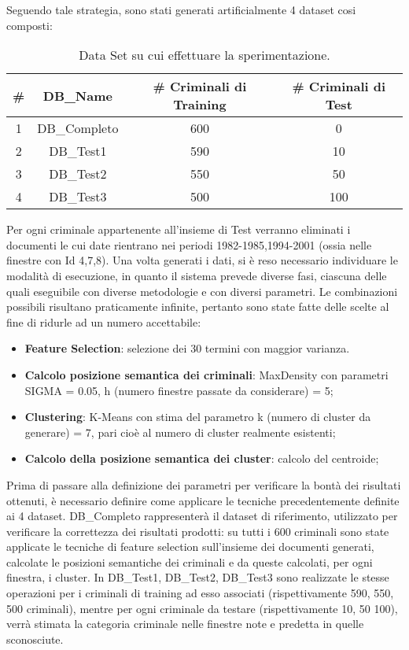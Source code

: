 Seguendo tale strategia, sono stati generati artificialmente 4 dataset cosi composti:
\begin{table}[H]
	\centering
	\footnotesize
	\begin{tabular}{|cccc|}
	\hline
	\textbf{\#} & \textbf{DB\_Name} & \textbf{\# Criminali di Training} & \textbf{\# Criminali di Test} \\ 
	\hline
	1 & DB\_Completo & 600 & 0 \\
	2 & DB\_Test1 & 590 & 10 \\
	3 & DB\_Test2 & 550 & 50 \\
	4 & DB\_Test3 & 500 & 100 \\
	\hline
	\end{tabular}
	\caption{Data Set su cui effettuare la sperimentazione.}
	\label{TAB_DB}
\end{table}
Per ogni criminale appartenente all'insieme di Test verranno eliminati i documenti le cui date rientrano nei periodi 1982-1985,1994-2001 (ossia nelle finestre con Id 4,7,8).
Una volta generati i dati, si è reso necessario individuare le modalità di esecuzione, in quanto il sistema prevede diverse fasi, ciascuna delle quali
eseguibile con diverse metodologie e con diversi parametri. Le combinazioni possibili risultano praticamente infinite, pertanto sono state fatte delle scelte al fine di ridurle ad un numero accettabile: 
\begin{itemize}
\item \textbf{Feature Selection}: selezione dei 30 termini con maggior varianza.
\item \textbf{Calcolo posizione semantica dei criminali}: MaxDensity con parametri SIGMA = 0.05, h (numero finestre passate da considerare) = 5;
\item \textbf{Clustering}: K-Means con stima del parametro k (numero di cluster da generare) = 7, pari cioè al numero di cluster realmente esistenti;
\item \textbf{Calcolo della posizione semantica dei cluster}: calcolo del centroide; 
\end{itemize}

Prima di passare alla definizione dei parametri per verificare la bontà dei risultati ottenuti, è necessario definire come applicare le tecniche precedentemente definite ai 4 dataset.
DB\_Completo rappresenterà il dataset di riferimento, utilizzato per verificare la correttezza dei risultati prodotti: su tutti i 600 criminali sono state applicate le tecniche di feature selection sull'insieme dei documenti generati, calcolate le posizioni semantiche dei criminali e da queste calcolati, per ogni finestra, i cluster.
In DB\_Test1, DB\_Test2, DB\_Test3 sono realizzate le stesse operazioni per i criminali di training ad esso associati (rispettivamente 590, 550, 500 criminali), mentre per ogni criminale da testare (rispettivamente 10, 50 100), verrà stimata la categoria criminale nelle finestre note e predetta in quelle sconosciute.

